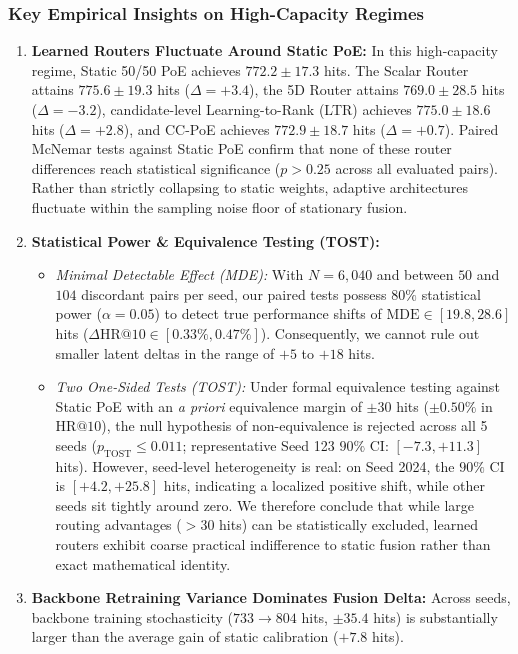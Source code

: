 \subsubsection{Key Empirical Insights on High-Capacity Regimes}
\begin{enumerate}[leftmargin=*]
    \item \textbf{Learned Routers Fluctuate Around Static PoE:} In this high-capacity regime, Static 50/50 PoE achieves $772.2 \pm 17.3$ hits. The Scalar Router attains $775.6 \pm 19.3$ hits ($\Delta = +3.4$), the 5D Router attains $769.0 \pm 28.5$ hits ($\Delta = -3.2$), candidate-level Learning-to-Rank (LTR) achieves $775.0 \pm 18.6$ hits ($\Delta = +2.8$), and CC-PoE achieves $772.9 \pm 18.7$ hits ($\Delta = +0.7$). Paired McNemar tests against Static PoE confirm that none of these router differences reach statistical significance ($p > 0.25$ across all evaluated pairs). Rather than strictly collapsing to static weights, adaptive architectures fluctuate within the sampling noise floor of stationary fusion.
    \item \textbf{Statistical Power \& Equivalence Testing (TOST):}
    \begin{itemize}
        \item \emph{Minimal Detectable Effect (MDE):} With $N=6{,}040$ and between $50$ and $104$ discordant pairs per seed, our paired tests possess $80\%$ statistical power ($\alpha = 0.05$) to detect true performance shifts of $\text{MDE} \in [19.8, 28.6]$ hits ($\Delta \text{HR@10} \in [0.33\%, 0.47\%]$). Consequently, we cannot rule out smaller latent deltas in the range of $+5$ to $+18$ hits.
        \item \emph{Two One-Sided Tests (TOST):} Under formal equivalence testing against Static PoE with an \emph{a priori} equivalence margin of $\pm 30$ hits ($\pm 0.50\%$ in $\text{HR@10}$), the null hypothesis of non-equivalence is rejected across all 5 seeds ($p_{\text{TOST}} \le 0.011$; representative Seed 123 $90\%$ CI: $[-7.3, +11.3]$ hits). However, seed-level heterogeneity is real: on Seed 2024, the $90\%$ CI is $[+4.2, +25.8]$ hits, indicating a localized positive shift, while other seeds sit tightly around zero. We therefore conclude that while large routing advantages ($>30$ hits) can be statistically excluded, learned routers exhibit coarse practical indifference to static fusion rather than exact mathematical identity.
    \end{itemize}
    \item \textbf{Backbone Retraining Variance Dominates Fusion Delta:} Across seeds, backbone training stochasticity ($733 \to 804$ hits, $\pm 35.4$ hits) is substantially larger than the average gain of static calibration ($+7.8$ hits).

\end{enumerate}
